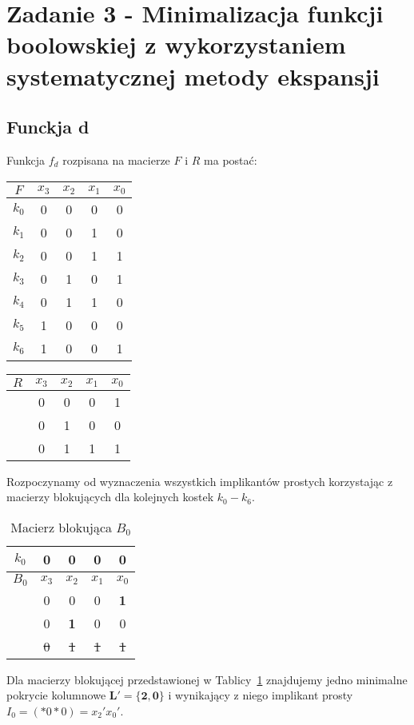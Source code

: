 \documentclass[a4paper, 12pt]{article}
\begin{document}
    \newpage
    \section{Zadanie 3 - Minimalizacja funkcji boolowskiej z wykorzystaniem systematycznej metody ekspansji}
    \label{sec:task-3}
    \subsection{Funckja d}\label{subsec:fun-d}
    Funkcja $f_d$ rozpisana na macierze $F$ i $R$ ma postać:
    \begin{center}
        \begin{tabular}[t]{ |c|c c c c| }
            \hline
            $F$ & $x_3$ & $x_2$ & $x_1$ & $x_0$ \\
            \hline
            $k_0$ & 0 & 0 & 0 & 0 \\
            $k_1$ & 0 & 0 & 1 & 0 \\
            $k_2$ & 0 & 0 & 1 & 1 \\
            $k_3$ & 0 & 1 & 0 & 1 \\
            $k_4$ & 0 & 1 & 1 & 0 \\
            $k_5$ & 1 & 0 & 0 & 0 \\
            $k_6$ & 1 & 0 & 0 & 1 \\
            \hline
        \end{tabular}
        \hspace{1cm}
        \begin{tabular}[t]{ |c|c c c c| }
            \hline
            $R$ & $x_3$ & $x_2$ & $x_1$ & $x_0$ \\
            \hline
            & 0 & 0 & 0 & 1 \\
            & 0 & 1 & 0 & 0 \\
            & 0 & 1 & 1 & 1 \\
            \hline
        \end{tabular}
    \end{center}

    Rozpoczynamy od wyznaczenia wszystkich implikantów prostych korzystając z macierzy blokujących dla kolejnych kostek
    $k_0-k_6$.
    \begin{table}[H]
        \centering
        \begin{tabular}[t]{ |c|c c c c| }
            \hline
            $k_0$ & 0 & 0 & 0 & 0 \\
            \hline\hline
            $B_0$ & $x_3$ & $x_2$ & $x_1$ & $x_0$ \\
            \hline
            & 0 & 0 & 0 & \textbf{1} \\
            & 0 & \textbf{1} & 0 & 0 \\
            & \sout{0} & \sout{1} & \sout{1} & \sout{1} \\
            \hline
        \end{tabular}
        \caption{Macierz blokująca $B_0$} \label{tab:b0}
    \end{table}
    Dla macierzy blokującej przedstawionej w Tablicy~\ref{tab:b0} znajdujemy jedno minimalne pokrycie kolumnowe
    $\bm{L'=\{2,0\}}$ i wynikający z niego implikant prosty $I_0=(*0*0)=x_2'x_0'$.
\end{document}
